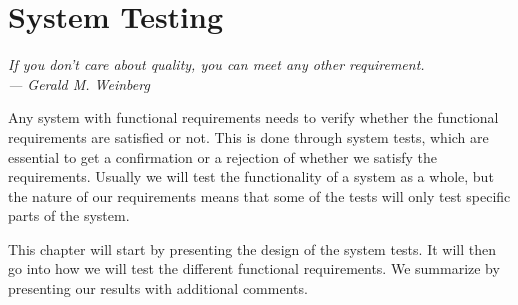 \chapter{System Testing}\label{ch:sys-test}

\begin{flushright}{\slshape
    If you don’t care about quality, you can meet any other requirement.\\ \medskip
    --- Gerald M. Weinberg}
\end{flushright}

Any system with functional requirements needs to verify whether the functional
requirements are satisfied or not. This is done through system tests, which are
essential to get a confirmation or a rejection of whether we satisfy the
requirements. Usually we will test the functionality of a system as a whole, but
the nature of our requirements means that some of the tests will only test
specific parts of the system.

This chapter will start by presenting the design of the system tests. It will
then go into how we will test the different functional requirements. We
summarize by presenting our results with additional comments.




